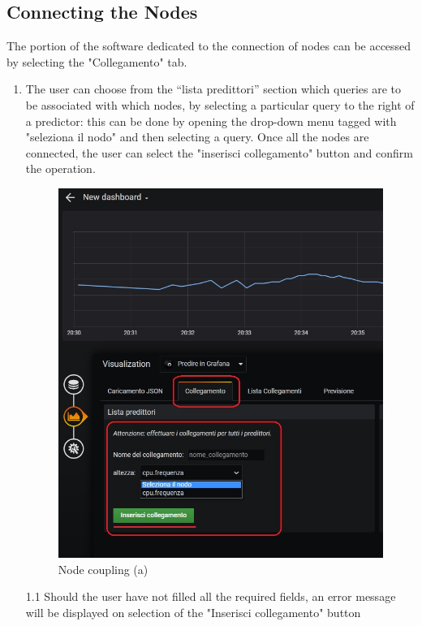 \subsection{Connecting the Nodes}
The portion of the software dedicated to the connection of nodes can be accessed by selecting the "Collegamento" tab.
\begin{enumerate}
	\item The user can choose from the “lista predittori” section which queries are to be associated with which nodes, by 
	selecting a particular query to the right of a predictor: this can be done by opening the drop-down menu tagged with "seleziona il nodo" and then selecting a query.
	Once all the nodes are connected, the user can select the "inserisci collegamento" button and confirm the operation.
	
\begin{figure}[H]
\centering
\includegraphics[scale=0.75]{img/plug-in/insert_node.jpg}
\caption{Node coupling (a)}
\end{figure}



\item[1.1] Should the user have not filled all the required fields, an error message will be displayed on selection of the "Inserisci collegamento" button
	

\end{enumerate}
